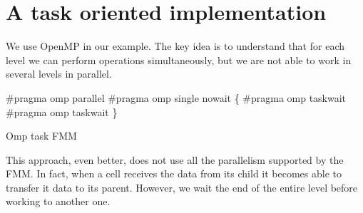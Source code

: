 \documentclass[12pt,letterpaper,titlepage]{report}
\begin{document}
\section{A task oriented implementation}
We use OpenMP in our example.
The key idea is to understand that for each level we can perform operations simultaneously, but we are not able to work in several levels in parallel.
\BlankLine
\begin{algorithm}[H]
\linesnumbered
\SetLine
\BlankLine
\#pragma omp parallel \linebreak
\#pragma omp single nowait \linebreak
\{ \linebreak
        \BlankLine
        \#pragma omp taskwait \linebreak
        \#pragma omp taskwait \linebreak
\} \linebreak
\BlankLine
\caption{Omp task FMM}
\end{algorithm}
\BlankLine
This approach, even better, does not use all the parallelism supported by the FMM.
In fact, when a cell receives the data from its child it becomes able to transfer it data to its parent. However, we wait the end of the entire level before working to another one.
\end{document}
